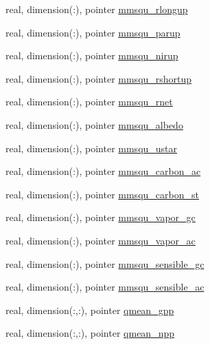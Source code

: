 \begin{DoxyCompactItemize}
real, dimension(\+:), pointer \hyperlink{structed__state__vars_1_1edtype_ae98782e651a8802de6742e208aad6fbe}{mmsqu\+\_\+rlongup}
\item 
real, dimension(\+:), pointer \hyperlink{structed__state__vars_1_1edtype_a8aeec186710063834d9d3794791e706b}{mmsqu\+\_\+parup}
\item 
real, dimension(\+:), pointer \hyperlink{structed__state__vars_1_1edtype_a35ed413c0a1803d5847af3ca6c54db9d}{mmsqu\+\_\+nirup}
\item 
real, dimension(\+:), pointer \hyperlink{structed__state__vars_1_1edtype_ac8e7d8ebe681bf7d7ffe70ddeecaae97}{mmsqu\+\_\+rshortup}
\item 
real, dimension(\+:), pointer \hyperlink{structed__state__vars_1_1edtype_aace5eccade82eb2c58de7d877cb8483c}{mmsqu\+\_\+rnet}
\item 
real, dimension(\+:), pointer \hyperlink{structed__state__vars_1_1edtype_af26abf7d1af8cf5b528bf2d22bb5de57}{mmsqu\+\_\+albedo}
\item 
real, dimension(\+:), pointer \hyperlink{structed__state__vars_1_1edtype_adf5d9279540d337b63206f64d719b524}{mmsqu\+\_\+ustar}
\item 
real, dimension(\+:), pointer \hyperlink{structed__state__vars_1_1edtype_a1393d9efb2660eec11cad6377e807d76}{mmsqu\+\_\+carbon\+\_\+ac}
\item 
real, dimension(\+:), pointer \hyperlink{structed__state__vars_1_1edtype_a43f1ee48a656e7040dba98811d59f76b}{mmsqu\+\_\+carbon\+\_\+st}
\item 
real, dimension(\+:), pointer \hyperlink{structed__state__vars_1_1edtype_acef463aa79868173ae867ecb887aa0d6}{mmsqu\+\_\+vapor\+\_\+gc}
\item 
real, dimension(\+:), pointer \hyperlink{structed__state__vars_1_1edtype_a65ac931cf3866e26c709623c57416739}{mmsqu\+\_\+vapor\+\_\+ac}
\item 
real, dimension(\+:), pointer \hyperlink{structed__state__vars_1_1edtype_a278c3461081c07bc16054fbf4f9b8f99}{mmsqu\+\_\+sensible\+\_\+gc}
\item 
real, dimension(\+:), pointer \hyperlink{structed__state__vars_1_1edtype_a4565dc0ae1bee65f7b2716cebe6c6f2f}{mmsqu\+\_\+sensible\+\_\+ac}
\item 
real, dimension(\+:,\+:), pointer \hyperlink{structed__state__vars_1_1edtype_a491a3d4ac27a7a15768dc06a1e86d3f0}{qmean\+\_\+gpp}
\item 
real, dimension(\+:,\+:), pointer \hyperlink{structed__state__vars_1_1edtype_af3a968ca49c3151d4280cbf0aea8a6c1}{qmean\+\_\+npp}

\end{DoxyCompactItemize}

